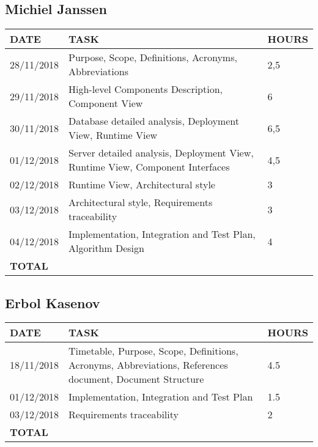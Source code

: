 \documentclass[12pt]{article}
\begin{document}
\subsection{Michiel Janssen}

\begin{center}
\begin{tabular}{ |p{}|p{}|p{}| } 
 \hline
 \textbf{DATE} & \textbf{TASK} & \textbf{HOURS} \\ 
 \hline 
  28/11/2018 & Purpose, Scope, Definitions, Acronyms, Abbreviations & 2,5\\
  \hline
  29/11/2018 & High-level Components Description, Component View & 6\\
  \hline
  30/11/2018 & Database detailed analysis, Deployment View, Runtime View & 6,5\\
  \hline
  01/12/2018 & Server detailed analysis, Deployment View, Runtime View, Component Interfaces & 4,5\\
  \hline
  02/12/2018 & Runtime View, Architectural style & 3\\
  \hline
  03/12/2018 & Architectural style, Requirements traceability & 3\\
  \hline
  04/12/2018 & Implementation, Integration and Test Plan, Algorithm Design & 4 \\
  \hline
  \textbf{TOTAL} & \multicolumn{2}{c|}{} \\ 
  \hline
\end{tabular}
\end{center}


\subsection{Erbol Kasenov}

\begin{center}
\begin{tabular}{ |p{}|p{}|p{}| } 
 \hline
 \textbf{DATE} & \textbf{TASK} & \textbf{HOURS} \\ 
  \hline
  18/11/2018 & Timetable, Purpose, Scope, Definitions, Acronyms, 
  Abbreviations, References document, Document Structure & 4.5\\ 
  \hline
  01/12/2018 & Implementation, Integration and Test Plan & 1.5\\ 
   \hline
  03/12/2018 & Requirements traceability & 2 \\ 
  \hline
  \textbf{TOTAL} & \multicolumn{2}{c|}{} \\ 
  \hline
\end{tabular}
\end{center}
\end{document}
